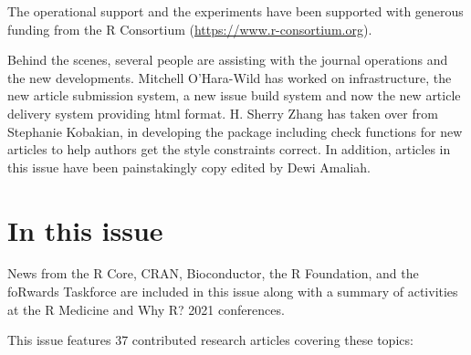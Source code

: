 The operational support and the experiments have been supported with generous funding from the R Consortium (\url{https://www.r-consortium.org}).

Behind the scenes, several people are assisting with the journal operations and the new developments. Mitchell O'Hara-Wild has worked on infrastructure, the new article submission system, a new issue build system and now the new article delivery system providing html format. H. Sherry Zhang has taken over from Stephanie Kobakian, in developing the  package including check functions for new articles to help authors get the style constraints correct. In addition, articles in this issue have been painstakingly copy edited by Dewi Amaliah.

\section{In this issue}\label{in-this-issue}

News from the R Core, CRAN, Bioconductor, the R Foundation, and the foRwards Taskforce are included in this issue along with a summary of activities at the R Medicine and Why R? 2021 conferences.

This issue features 37 contributed research articles covering these topics:

